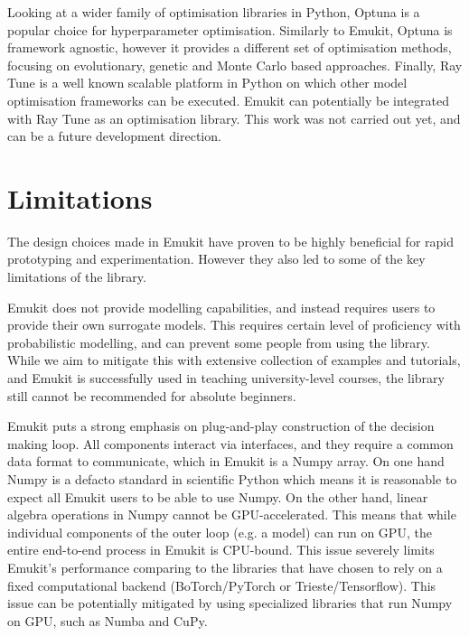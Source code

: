 Looking at a wider family of optimisation libraries in Python, Optuna \cite{optuna_2019} is a popular choice for hyperparameter optimisation. Similarly to Emukit, Optuna is framework agnostic, however it provides a different set of optimisation methods, focusing on evolutionary, genetic and Monte Carlo based approaches. Finally, Ray Tune \cite{liaw2018tune} is a well known scalable platform in Python on which other model optimisation frameworks can be executed. Emukit can potentially be integrated with Ray Tune as an optimisation library. This work was not carried out yet, and can be a future development direction.

\section{Limitations}\label{section:limitations}
The design choices made in Emukit have proven to be highly beneficial for rapid prototyping and experimentation. However they also led to some of the key limitations of the library.

Emukit does not provide modelling capabilities, and instead requires users to provide their own surrogate models. This requires certain level of proficiency with probabilistic modelling, and can prevent some people from using the library. While we aim to mitigate this with extensive collection of examples and tutorials, and Emukit is successfully used in teaching university-level courses, the library still cannot be recommended for absolute beginners.

Emukit puts a strong emphasis on plug-and-play construction of the decision making loop. All components interact via interfaces, and they require a common data format to communicate, which in Emukit is a Numpy array. On one hand Numpy is a defacto standard in scientific Python which means it is reasonable to expect all Emukit users to be able to use Numpy. On the other hand, linear algebra operations in Numpy cannot be GPU-accelerated. This means that while individual components of the outer loop  (e.g. a model) can run on GPU, the entire end-to-end process in Emukit is CPU-bound. This issue severely limits Emukit's performance comparing to the libraries that have chosen to rely on a fixed computational backend (BoTorch/PyTorch or Trieste/Tensorflow). This issue can be potentially mitigated by using specialized libraries that run Numpy on GPU, such as Numba and CuPy.

